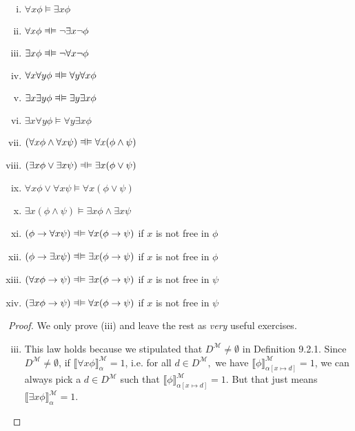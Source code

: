 \begin{enumerate}[\thesection.1]
\begin{proposition}
\begin{enumerate}[(i)]
		\item $\forall x\phi\vDash\exists x\phi$
		
		\item $\forall x\phi\equi \neg \exists x\neg\phi$
	
			\item $\exists x\phi\equi \neg \forall x\neg \phi$
		
			\item $\forall x\forall y\phi\equi \forall y\forall x\phi$

	\item $\exists x\exists y\phi\equi \exists y\exists x\phi$

	\item $\exists x\forall y\phi\vDash \forall y \exists x\phi$
		
	\item $(\forall x\phi\land \forall x\psi)\equi \forall x(\phi\land \psi)$

	\item $(\exists x\phi\lor \exists x\psi)\equi \exists x(\phi\lor \psi)$

	\item $\forall x\phi\lor \forall x\psi\vDash \forall x(\phi\lor \psi)$  

	\item  $\exists x(\phi\land \psi)\vDash \exists x\phi\land \exists x \psi$  
	\item $(\phi\to \forall x\psi)\equi \forall x(\phi\to \psi)$ if $x$ is not free in $\phi$

	\item $(\phi\to \exists x\psi)\equi \exists x(\phi\to \psi)$ if $x$ is not free in $\phi$

	\item $(\forall x\phi\to \psi)\equi \exists x(\phi\to \psi)$ if $x$ is not free in $\psi$

	\item $(\exists x\phi\to \psi)\equi \forall x(\phi\to \psi)$ if $x$ is not free in $\psi$

		\end{enumerate}

	\end{proposition}
	
	\begin{proof}
	We only prove (iii) and leave the rest as \emph{very} useful exercises.
	
	\begin{enumerate}[(i)]
	\setcounter{enumi}{2}
		\item  This law holds because we stipulated that $D^\mathcal{M}\neq \emptyset$ in Definition 9.2.1. Since $D^\mathcal{M}\neq \emptyset$, if $\llbracket\forall x\phi\rrbracket_\alpha^\mathcal{M}=1$, i.e. for all $d\in D^\mathcal{M},$ we have $\llbracket\phi\rrbracket^\mathcal{M}_{\alpha[x\mapsto d]}=1$, we can always pick a $d\in D^\mathcal{M}$ such that $\llbracket\phi\rrbracket^\mathcal{M}_{\alpha[x\mapsto d]}=1$. But that just means $\llbracket\exists x\phi\rrbracket_\alpha^\mathcal{M}=1$.
			

\end{enumerate}
\end{proof}
\end{enumerate}
